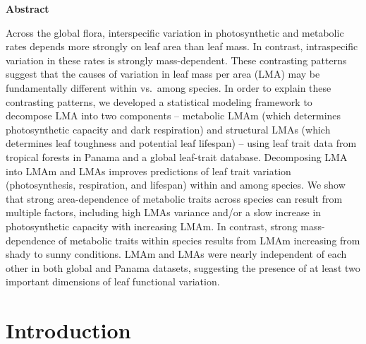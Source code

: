 \documentclass[
  12pt,
  letterpaper,
  DIV=11,
  numbers=noendperiod]{scrartcl}
\providecommand{\DIFaddend}{} %
\DeclareRobustCommand{\DIFaddend}{\DIFOaddend \let\includegraphics\DIFOincludegraphics} %
\begin{document}
\DIFaddend \textbf{Abstract}

Across the global flora, interspecific variation in photosynthetic and
metabolic rates depends more strongly on leaf area than leaf mass. In
contrast, intraspecific variation in these rates is strongly
mass-dependent. These contrasting patterns suggest that the causes of
variation in leaf mass per area (LMA) may be fundamentally different
within vs.~among species. In order to explain these contrasting
patterns, we developed a statistical modeling framework to decompose LMA
into two components -- metabolic LMAm (which determines photosynthetic
capacity and dark respiration) and structural LMAs (which determines
leaf toughness and potential leaf lifespan) -- using leaf trait data
from tropical forests in Panama and a global leaf-trait database.
Decomposing LMA into LMAm and LMAs improves predictions of leaf trait
variation (photosynthesis, respiration, and lifespan) within and among
species. We show that strong area-dependence of metabolic traits across
species can result from multiple factors, including high LMAs variance
and/or a slow increase in photosynthetic capacity with increasing LMAm.
In contrast, strong mass-dependence of metabolic traits within species
results from LMAm increasing from shady to sunny conditions. LMAm and
LMAs were nearly independent of each other in both global and Panama
datasets, suggesting the presence of at least two important dimensions
of leaf functional variation.

\section{Introduction}\label{introduction}
\end{document}
